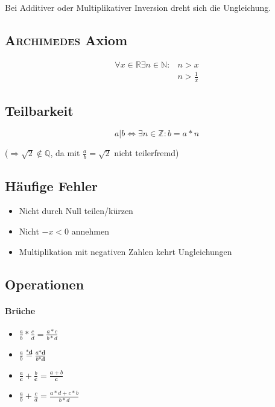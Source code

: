 Bei Additiver oder Multiplikativer Inversion dreht sich die Ungleichung.

\subsection{\textsc{Archimedes} Axiom}

\begin{align*}
  \forall x \in \mathbb{R} \exists n \in \mathbb{N}: & n > x           \\
                                                     & n > \frac{1}{x}
\end{align*}

\subsection{Teilbarkeit}

$$a | b \Leftrightarrow \exists n \in \mathbb{Z}: b = a * n$$

($\Rightarrow \sqrt{2} \notin \mathbb{Q}$, da mit $\frac{a}{b} = \sqrt{2}$ nicht teilerfremd)

\subsection{Häufige Fehler}

\begin{itemize}
  \item Nicht durch Null teilen/kürzen

  \item Nicht $-x < 0$ annehmen

  \item Multiplikation mit negativen Zahlen kehrt Ungleichungen
\end{itemize}

\subsection{Operationen}

\paragraph{Brüche}

\begin{itemize}
  \item $\frac{a}{b} * \frac{c}{d} = \frac{a * c}{b * d}$

  \item $\frac{a}{b} \overset{\mathbf{* d}}{=} \frac{a \mathbf{* d}}{b \mathbf{* d}}$

  \item $\frac{a}{\mathbf{c}} + \frac{b}{\mathbf{c}} = \frac{a + b}{\mathbf{c}}$

  \item $\frac{a}{b} + \frac{c}{d} = \frac{a * d + c * b}{b * d}$
\end{itemize}

